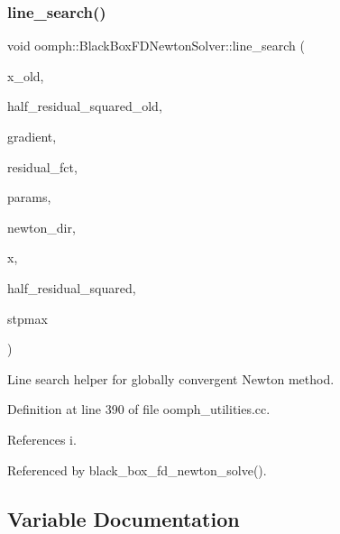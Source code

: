 \subsubsection{\texorpdfstring{line\+\_\+search()}{line\_search()}}
{\footnotesize\ttfamily void oomph\+::\+Black\+Box\+F\+D\+Newton\+Solver\+::line\+\_\+search (\begin{DoxyParamCaption}\item[{const \hyperlink{classoomph_1_1Vector}{Vector}$<$ double $>$ \&}]{x\+\_\+old,  }\item[{const double}]{half\+\_\+residual\+\_\+squared\+\_\+old,  }\item[{const \hyperlink{classoomph_1_1Vector}{Vector}$<$ double $>$ \&}]{gradient,  }\item[{\hyperlink{namespaceoomph_1_1BlackBoxFDNewtonSolver_a0b45d0bd1b7ae8ff5c24715b6118d1fd}{Residual\+Fct\+Pt}}]{residual\+\_\+fct,  }\item[{const \hyperlink{classoomph_1_1Vector}{Vector}$<$ double $>$ \&}]{params,  }\item[{\hyperlink{classoomph_1_1Vector}{Vector}$<$ double $>$ \&}]{newton\+\_\+dir,  }\item[{\hyperlink{classoomph_1_1Vector}{Vector}$<$ double $>$ \&}]{x,  }\item[{double \&}]{half\+\_\+residual\+\_\+squared,  }\item[{const double \&}]{stpmax }\end{DoxyParamCaption})}



Line search helper for globally convergent Newton method. 



Definition at line 390 of file oomph\+\_\+utilities.\+cc.



References i.



Referenced by black\+\_\+box\+\_\+fd\+\_\+newton\+\_\+solve().



\subsection{Variable Documentation}
\mbox{\label{namespaceoomph_1_1BlackBoxFDNewtonSolver_ac2603699f47446716ca5a818f46a7f17}} 
